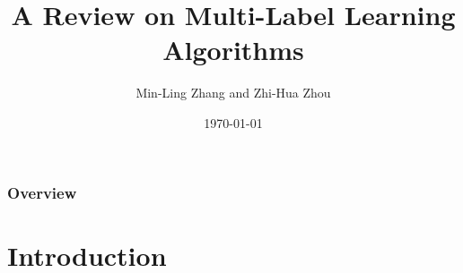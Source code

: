 \documentclass{beamer}
\title[Large-Scale Data Analysis Techniques]{A Review on Multi-Label Learning Algorithms} %
\author[Sissy Themeli, Nikiforos Pittaras]{Min-Ling Zhang and Zhi-Hua Zhou} %
\institute[DI-UOA] %
{
	IEEE Transactions On Knowledge And Data Engineering\\ %
	\medskip
}
\date{\today} %
\begin{document}
	
	\begin{frame}
	\titlepage %
\end{frame}

\begin{frame}
\frametitle{Overview} %
\tableofcontents %
\end{frame}


\section{Introduction} %
\end{document}
